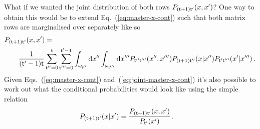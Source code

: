 \documentclass{book}
\begin{document}
What if we wanted the joint distribution of both rows $P_{({\sf t}+1){\sf t}'}(x,x')$? One way to obtain this would be to extend Eq.~(\ref{eq:master-x-cont}) such that both matrix rows are marginalised over separately like so
\begin{align}
&P_{({\sf t}+1){\sf t}'}(x,x') = \nonumber \\
&\qquad \frac{1}{({\sf t}'-1){\sf t}}\sum_{{\sf t}''=0}^{{\sf t}}\sum_{{\sf t}'''=0}^{{\sf t}'-1}\int_{\omega_{{\sf t}''}}{\rm d}x''\int_{\omega_{{\sf t}'''}}{\rm d}x''' P_{{\sf t}''{\sf t}'''}(x'', x''') P_{({\sf t}+1){\sf t}''}(x\vert x'')P_{{\sf t}'{\sf t}'''}(x'\vert x''') \label{eq:joint-master-x-cont} \,.
\end{align}
Given Eqs.~(\ref{eq:master-x-cont}) and~(\ref{eq:joint-master-x-cont}) it's also possible to work out what the conditional probabilities would look like using the simple relation
\begin{align}
P_{({\sf t}+1){\sf t}'}(x\vert x') &= \frac{P_{({\sf t}+1){\sf t}'}(x,x')}{P_{{\sf t}'}(x')} \label{eq:cond-master-x-cont} \,.
\end{align}
\end{document}
